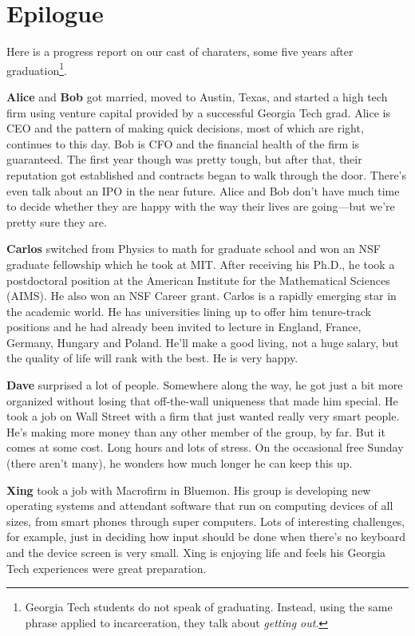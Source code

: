 
\chapter*{Epilogue}\label{ch:epilogue}

Here is a progress report on our cast of charaters, some five
years after graduation\footnote{Georgia Tech students do not speak of
graduating.  Instead, using the same phrase applied to incarceration,
they talk about \textit{getting out}.}.

\medskip
\noindent
\textbf{Alice} and \textbf{Bob} got married, moved to Austin, Texas,
and started a high tech firm using venture capital provided by a
successful Georgia Tech grad.  Alice is CEO and the pattern of
making quick decisions, most of which are right, continues to this
day.  Bob is CFO and the financial health of the firm is guaranteed.
The first year though was pretty tough, but after that, their
reputation got established and contracts began to walk through the
door.  There's even talk about an IPO in the near future.  Alice
and Bob don't have much time to decide whether they are happy
with the way their lives are going---but we're pretty sure they
are.

\medskip
\noindent
\textbf{Carlos} switched from Physics to math for graduate school and
won an NSF graduate fellowship which he took at MIT.  After receiving
his Ph.D., he took a postdoctoral position at the American Institute
for the Mathematical Sciences (AIMS).  He also won an NSF Career grant.
Carlos is a rapidly emerging star in the academic world.  He has
universities lining up to offer him tenure-track positions and
he had already been invited to lecture in England, France,
Germany, Hungary and Poland.  He'll
make a good living, not a huge salary, but the quality of life
will rank with the best.  He is very happy.

\medskip
\noindent
\textbf{Dave} surprised a lot of people.  Somewhere along the way,
he got just a bit more organized without losing that off-the-wall
uniqueness that made him special.  He took a job on Wall Street
with a firm that just wanted really very smart people.  He's making
more money than any other member of the group, by far.  But it
comes at some cost.  Long hours and lots of stress.  On the
occasional free Sunday (there aren't many), he wonders how
much longer he can keep this up.

\medskip
\noindent
\textbf{Xing} took a job with Macrofirm in Bluemon.  His group
is developing new operating systems and attendant software that run
on computing devices of all sizes, from smart phones through super
computers.  Lots of interesting challenges, for example, just
in deciding how input should be done when there's no keyboard and
the device screen is very small.  Xing is enjoying life and feels 
his Georgia Tech experiences were great preparation.

